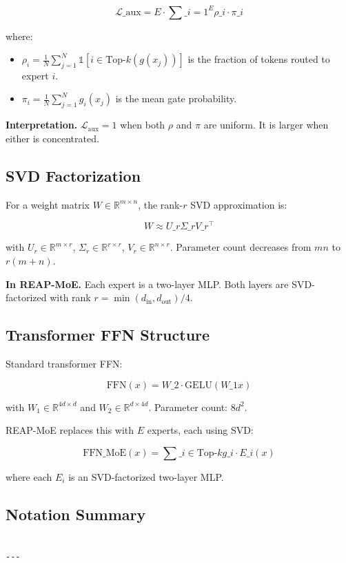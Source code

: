 \[
\mathcal{L}\_\text{aux} = E \cdot \sum\_{i=1}^{E} \rho\_i \cdot \pi\_i
\tag{3.5}
\]

where:
\begin{itemize}
\item $\rho_i = \frac{1}{N} \sum_{j=1}^{N} \mathbb{1}[i \in \text{Top-}k(g(x_j))]$ is
  the fraction of tokens routed to expert $i$.
\item $\pi_i = \frac{1}{N} \sum_{j=1}^{N} g_i(x_j)$ is the mean gate probability.

\end{itemize}
\textbf{Interpretation.} $\mathcal{L}_\text{aux} = 1$ when both $\rho$ and $\pi$ are 
uniform. It is larger when either is concentrated.

\subsection{SVD Factorization}

For a weight matrix $W \in \mathbb{R}^{m \times n}$, the rank-$r$ SVD 
approximation is:

\[
W \approx U\_r \Sigma\_r V\_r^\top
\tag{3.6}
\]

with $U_r \in \mathbb{R}^{m \times r}$, $\Sigma_r \in \mathbb{R}^{r \times r}$, 
$V_r \in \mathbb{R}^{n \times r}$. Parameter count decreases from $mn$ to 
$r(m + n)$.

\textbf{In REAP-MoE.} Each expert is a two-layer MLP. Both layers are SVD-factorized 
with rank $r = \min(d_\text{in}, d_\text{out}) / 4$.

\subsection{Transformer FFN Structure}

Standard transformer FFN:

\[
\text{FFN}(x) = W\_2 \cdot \text{GELU}(W\_1 x)
\tag{3.7}
\]

with $W_1 \in \mathbb{R}^{4d \times d}$ and $W_2 \in \mathbb{R}^{d \times 4d}$. 
Parameter count: $8d^2$.

REAP-MoE replaces this with $E$ experts, each using SVD:

\[
\text{FFN}\_\text{MoE}(x) = \sum\_{i \in \text{Top-}k} g\_i \cdot E\_i(x)
\tag{3.8}
\]

where each $E_i$ is an SVD-factorized two-layer MLP.

\subsection{Notation Summary}

\begin{lstlisting}

---
\end{lstlisting}